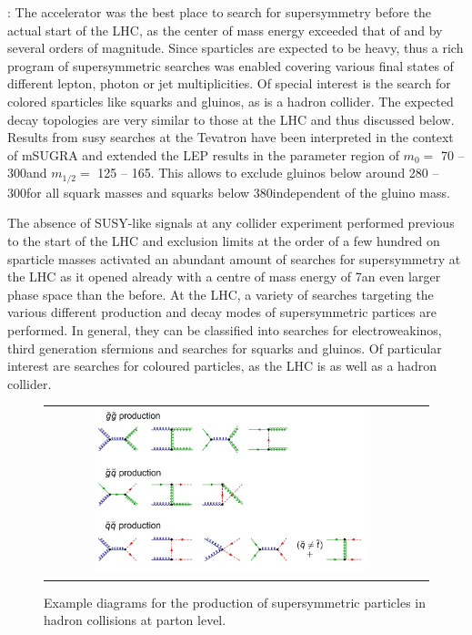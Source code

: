 \begin{description}
 \item \textbf{\tevatron \cite{CDFLimits, D0Limits, Abazov200934}}: The \tevatron accelerator was the best place to search for supersymmetry before the actual start of the LHC, as the center of mass energy exceeded that of \hera and \lep by several orders of magnitude. Since sparticles are expected to be heavy, thus a rich program of supersymmetric searches was enabled covering various final states of different lepton, photon or jet multiplicities. Of special interest is the search for colored sparticles like squarks and gluinos, as \tevatron is a hadron collider. The expected decay topologies are very similar to those at the LHC and thus discussed below. Results from susy searches at the Tevatron have been interpreted in the context of mSUGRA and extended the LEP results in the parameter region of $m_{0} =$ 70 -- 300\gev and $m_{1/2} =$ 125 -- 165\gev. This allows to exclude gluinos below around 280 -- 300\gev for all squark masses and squarks below $380$\gev independent of the gluino mass. 
\end{description}
The absence of SUSY-like signals at any collider experiment performed previous to the start of the LHC and exclusion limits at the order of a few hundred \gev on sparticle masses activated an abundant amount of searches for supersymmetry at the LHC as it opened already with a centre of mass energy of 7\tev an even larger phase space than the \tevatron before. At the LHC, a variety of searches targeting the various different production and decay modes of supersymmetric partices are performed. In general, they can be classified into searches for electroweakinos, third generation sfermions and searches for squarks and gluinos. Of particular interest are searches for coloured particles, as the LHC is as well as \tevatron a hadron collider. \\
\begin{figure}[!tp]
  \centering 
  \begin{tabular}{cc}
    \includegraphics[width=0.75\textwidth]{figures/Susy_Feynman.jpg} 
  \end{tabular}
  \caption{Example diagrams for the production of supersymmetric particles in hadron collisions at parton level.}
  \label{fig:susy_feynman}
\end{figure}
